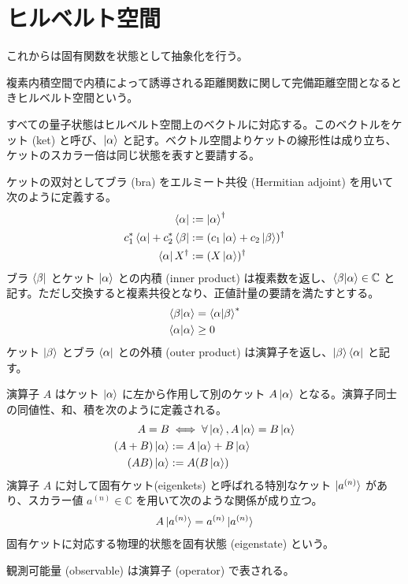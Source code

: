 \documentclass[uplatex,dvipdfmx,a4paper,11pt]{jlreq}
\newcommand{\CC}{\mathbb{C}}
\theoremstyle{definition}
\begin{document}
\section{ヒルベルト空間}
これからは固有関数を状態として抽象化を行う。
\begin{definition}
  複素内積空間で内積によって誘導される距離関数に関して完備距離空間となるときヒルベルト空間という。
\end{definition}
\begin{definition}[ブラケット]
  すべての量子状態はヒルベルト空間上のベクトルに対応する。このベクトルをケット (ket) と呼び、$\ket{\alpha}$ と記す。ベクトル空間よりケットの線形性は成り立ち、ケットのスカラー倍は同じ状態を表すと要請する。

  ケットの双対としてブラ (bra) をエルミート共役 (Hermitian adjoint) を用いて次のように定義する。
  \begin{align}
    \bra{\alpha}                         & := \ket{\alpha}^\dagger                       \\
    c_1^*\bra{\alpha} + c_2^*\bra{\beta} & := (c_1\ket{\alpha} + c_2\ket{\beta})^\dagger \\
    \bra{\alpha}X^\dagger                & := (X\ket{\alpha})^\dagger
  \end{align}
  ブラ $\bra{\beta}$ とケット $\ket{\alpha}$ との内積 (inner product) は複素数を返し、$\braket{\beta|\alpha}\in\CC$ と記す。ただし交換すると複素共役となり、正値計量の要請を満たすとする。
  \begin{align}
    \braket{\beta|\alpha}  & = \braket{\alpha|\beta}^* \\
    \braket{\alpha|\alpha} & \geq 0
  \end{align}
  ケット $\ket{\beta}$ とブラ $\bra{\alpha}$ との外積 (outer product) は演算子を返し、$\ket{\beta}\bra{\alpha}$ と記す。
\end{definition}
\begin{definition}[演算子]
  演算子 $A$ はケット $\ket{\alpha}$ に左から作用して別のケット $A\ket{\alpha}$ となる。演算子同士の同値性、和、積を次のように定義される。
  \begin{align}
    A = B               & \iff \forall \ket{\alpha}, A\ket{\alpha} = B\ket{\alpha} \\
    (A + B)\ket{\alpha} & := A\ket{\alpha} + B\ket{\alpha}                         \\
    (AB)\ket{\alpha}    & := A(B\ket{\alpha})
  \end{align}
  演算子 $A$ に対して固有ケット(eigenkets) と呼ばれる特別なケット $\ket{a^{(n)}}$ があり、スカラー値 $a^{(n)}\in\CC$ を用いて次のような関係が成り立つ。
  \begin{align}
    A\ket{a^{(n)}} = a^{(n)}\ket{a^{(n)}}
  \end{align}
  固有ケットに対応する物理的状態を固有状態 (eigenstate) という。
\end{definition}
観測可能量 (observable) は演算子 (operator) で表される。
\end{document}

